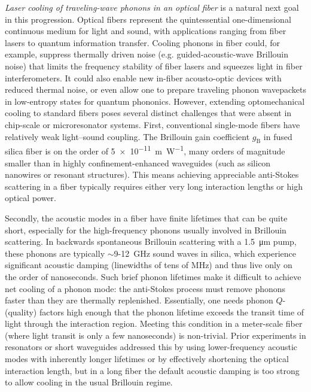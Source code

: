 \textit{Laser cooling of traveling-wave phonons in an optical fiber} is a natural next goal in this progression. Optical fibers represent the quintessential one-dimensional continuous medium for light and sound, with applications ranging from fiber lasers to quantum information transfer. Cooling phonons in fiber could, for example, suppress thermally driven noise (e.g. guided-acoustic-wave Brillouin noise) that limits the frequency stability of fiber lasers and squeezes light in fiber interferometers. \cite{shin2015control} It could also enable new in-fiber acousto-optic devices with reduced thermal noise, or even allow one to prepare traveling phonon wavepackets in low-entropy states for quantum phononics. However, extending optomechanical cooling to standard fibers poses several distinct challenges that were absent in chip-scale or microresonator systems. First, conventional single-mode fibers have relatively weak light–sound coupling. The Brillouin gain coefficient \(g_{\mathrm{B}}\) in fused silica fiber is on the order of \SI{5e-11}{\meter\per\watt}, \cite{abedin2005observation, vysloukh1990nonlinear} many orders of magnitude smaller than in highly confinement-enhanced waveguides (such as silicon nanowires or resonant structures). This means achieving appreciable anti-Stokes scattering in a fiber typically requires either very long interaction lengths or high optical power.

Secondly, the acoustic modes in a fiber have finite lifetimes that can be quite short, especially for the high-frequency phonons usually involved in Brillouin scattering. In backwards spontaneous Brillouin scattering with a \SI{1.5}{\micro\meter} pump, these phonons are typically \(\sim\)9-\SI{12}{\giga\hertz} sound waves in silica, which experience significant acoustic damping (linewidths of tens of \si{\mega\hertz}) and thus live only on the order of nanoseconds. \cite{endo2021coherent} Such brief phonon lifetimes make it difficult to achieve net cooling of a phonon mode: the anti-Stokes process must remove phonons faster than they are thermally replenished. Essentially, one needs phonon \(Q\)- (quality) factors high enough that the phonon lifetime exceeds the transit time of light through the interaction region. Meeting this condition in a meter-scale fiber (where light transit is only a few nanoseconds) is non-trivial. Prior experiments in resonators or short waveguides addressed this by using lower-frequency acoustic modes with inherently longer lifetimes \cite{bahl2012observation} or by effectively shortening the optical interaction length, but in a long fiber the default acoustic damping is too strong to allow cooling in the usual Brillouin regime.

